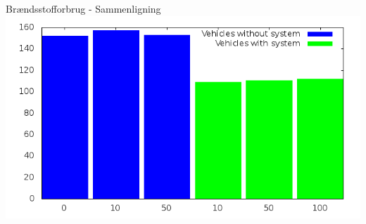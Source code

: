 \begin{frame}{Brændsstofforbrug - Sammenligning}
\includegraphics[width=1\textwidth]{../Article/images/tp0/combinedFuel.png}
\end{frame}




